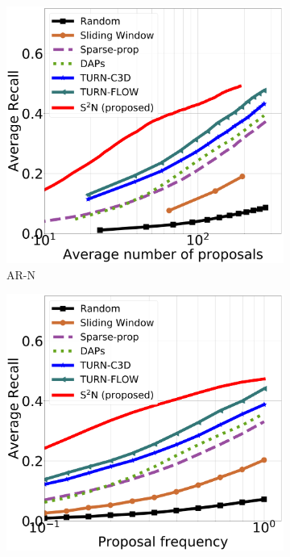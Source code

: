 \documentclass[10pt,journal,compsoc]{IEEEtran}
\begin{document}
\begin{figure}[t]
\centering
    
    \begin{subfigure}[b]{0.32\textwidth}
   	\includegraphics[width=\textwidth]{figures/results/Ours_avg_recall_pub.pdf}
    \caption{AR-N}
   \end{subfigure}
   \begin{subfigure}[b]{0.32\textwidth}
   	\includegraphics[width=\textwidth]{figures/results/Ours_freq_pub.pdf}

\end{subfigure}
\end{figure}
\end{document}
